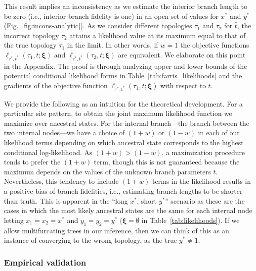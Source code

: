 \documentclass[11pt]{article}
\begin{document}
This result implies an inconsistency as we estimate the interior branch length to be zero (i.e., interior branch fidelity is one) in an open set of values for $x^*$ and $y^*$ (Fig.~\ref{fig:incons-analytic}).
As we consider different topologies $\tau_1$ and $\tau_2$ for $\hat{t}$, the incorrect topology $\tau_2$ attains a likelihood value at its maximum equal to that of the true topology $\tau_1$ in the limit.
In other words, if $w=1$ the objective functions $\ell_{\tau^*,t^*}(\tau_1, t; \boldsymbol\xi)$ and $\ell_{\tau^*,t^*}(\tau_2, t; \boldsymbol\xi)$ are equivalent.
We elaborate on this point in the Appendix.
The proof is through analyzing upper and lower bounds of the potential conditional likelihood forms in Table~\ref{tab:farris_likelihoods} and the gradients of the objective function $\ell_{\tau^*,t^*}(\tau_1, t; \boldsymbol\xi)$ with respect to $t$.


We provide the following as an intuition for the theoretical development.
For a particular site pattern, to obtain the joint maximum likelihood function we maximize over ancestral states.
For the internal branch---the branch between the two internal nodes---we have a choice of $(1+w)$ or $(1-w)$ in each of our likelihood terms depending on which ancestral state corresponds to the highest conditional log-likelihood.
As $(1+w) > (1-w)$, a maximization procedure tends to prefer the $(1+w)$ term, though this is not guaranteed because the maximum depends on the values of the unknown branch parameters $t$.
Nevertheless, this tendency to include $(1+w)$ terms in the likelihood results in a positive bias of branch fidelities, i.e., estimating branch lengths to be shorter than truth.
This is apparent in the ``long $x^*$, short $y^*$'' scenario as these are the cases in which the most likely ancestral states are the same for each internal node letting $x_1=x_2=x^*$ and $y_1=y_2=y^*$ ($\boldsymbol\xi=\emptyset$ in Table~\ref{tab:likelihoods}).
If we allow multifurcating trees in our inference, then we can think of this as an instance of converging to the wrong topology, as the true $y^*\neq 1$.

\subsubsection*{Empirical validation}
\end{document}
